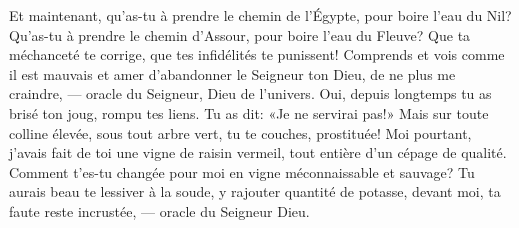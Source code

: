 Et maintenant,
	qu’as-tu à prendre le chemin de l’Égypte, pour boire l’eau du Nil?
	Qu’as-tu à prendre le chemin d’Assour, pour boire l’eau du Fleuve?
Que ta méchanceté te corrige, que tes infidélités te punissent!
	Comprends et vois comme il est mauvais et amer
		d’abandonner le Seigneur ton Dieu,
	de ne plus me craindre, --- oracle du Seigneur, Dieu de l’univers.
Oui, depuis longtemps tu as brisé ton joug, rompu tes liens.
	Tu as dit: «Je ne servirai pas!»
Mais sur toute colline élevée, sous tout arbre vert,
	tu te couches, prostituée!
Moi pourtant, j’avais fait de toi une vigne de raisin vermeil,
	tout entière d’un cépage de qualité.
Comment t’es-tu changée pour moi en vigne méconnaissable et sauvage?
Tu aurais beau te lessiver à la soude, y rajouter quantité de potasse,
	devant moi, ta faute reste incrustée, --- oracle du Seigneur Dieu.
